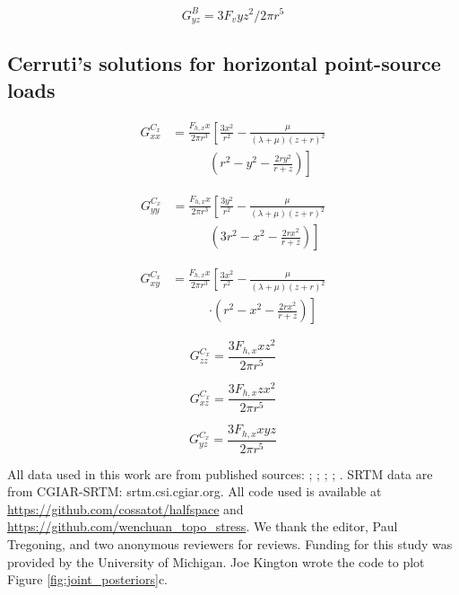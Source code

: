 \documentclass[draft,jgrga]{AGUTeX}
\begin{document}
\begin{article}
\begin{equation}
G_{yz}^{B} = 3 F _{v} yz^{2} / 2 \pi r^{5}
\end{equation}

\subsection{Cerruti's solutions for horizontal point-source
loads}\label{cerrutis-solutions-for-horizontal-point-source-loads}

\begin{equation}
\begin{split}
G_{xx}^{C_x} &= \frac{ F_{h,x} x }{2 \pi r^3} \left[ \frac{ 3x^2}{r^2} \right.
- \frac{\mu}{(\lambda + \mu)(z+r)^2} 
\\
&\qquad \quad  \left. (r^2 - y^2 - \frac{2ry^2}{r+z}) \right]
\end{split}
\end{equation}

\begin{equation}
\begin{split}
G_{yy}^{C_x} & = \frac{ F_{h,x} x }{2 \pi r^3} \left[ \frac{ 3y^2}{r^2} \right.
- \frac{\mu}{(\lambda + \mu)(z+r)^2} \\
& \qquad \quad \left. (3r^2 - x^2 - \frac{2rx^2}{r+z}) \right]
\end{split}
\end{equation}

\begin{equation}
\begin{split}
G_{xy}^{C_x} & = \frac{ F_{h,x} x }{2 \pi r^3} \left[ \frac{ 3x^2}{r^2} \right.
- \frac{\mu}{(\lambda + \mu)(z+r)^2} 
\\
&\qquad \quad \left. \cdot (r^2 - x^2 - \frac{2rx^2}{r+z}) \right]
\end{split}
\end{equation}

\begin{equation}
    G^{C_x}_{zz} = \frac{ 3 F_{h,x} x z^2 }{2 \pi r^5}
\end{equation}

\begin{equation}
    G^{C_x}_{xz} = \frac{ 3 F_{h,x} z x^2 }{2 \pi r^5}
\end{equation}

\begin{equation}
    G^{C_x}_{yz} = \frac{ 3 F_{h,x} x y z }{2 \pi r^5}
\end{equation}

\begin{acknowledgements}
All data used in this work are from published sources: \citet{shen2009};
\citet{feng2010}; \citet{qi2011}; \citet{zhang2011}; \citet{fielding2013}. SRTM
data are from CGIAR-SRTM: srtm.csi.cgiar.org. All code used is available at
\url{https://github.com/cossatot/halfspace} and
\url{https://github.com/wenchuan_topo_stress}. We thank the editor, Paul
Tregoning, and two anonymous reviewers for reviews. Funding for
this study was provided by the University of Michigan. Joe Kington wrote the
code to plot Figure \ref{fig:joint_posteriors}c.  
\end{acknowledgements}


\end{article}
\end{document}
